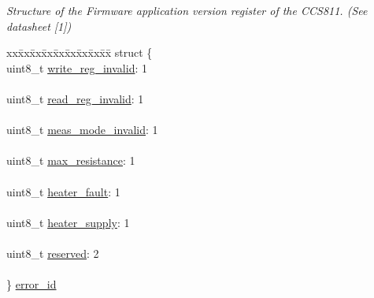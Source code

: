 \begin{DoxyCompactItemize}
\begin{tabbing}
\end{tabbing}\begin{DoxyCompactList}\small\item\em Structure of the Firmware application version register of the C\+C\+S811. (See datasheet \mbox{[}1\mbox{]}) \end{DoxyCompactList}\item 
\begin{tabbing}
xx\=xx\=xx\=xx\=xx\=xx\=xx\=xx\=xx\=\kill
struct \{\\
\>uint8\_t \mbox{\hyperlink{union_application_register_ad12c9d2951e327af89e59746d1b3d226}{write\_reg\_invalid}}: 1\\
\>\\
\>uint8\_t \mbox{\hyperlink{union_application_register_a2b3d9305e883ec18bb375b58a265bb51}{read\_reg\_invalid}}: 1\\
\>\\
\>uint8\_t \mbox{\hyperlink{union_application_register_ac1cd54e98a1f9b1b41ea65176838dae1}{meas\_mode\_invalid}}: 1\\
\>\\
\>uint8\_t \mbox{\hyperlink{union_application_register_a2759d6aaf610578f39c5e905d3d9faaa}{max\_resistance}}: 1\\
\>\\
\>uint8\_t \mbox{\hyperlink{union_application_register_a5afdc7bfd0e35f5d61dff3444cdeae18}{heater\_fault}}: 1\\
\>\\
\>uint8\_t \mbox{\hyperlink{union_application_register_ab94a39c08c3ab36f0844b5b493ef9945}{heater\_supply}}: 1\\
\>\\
\>uint8\_t \mbox{\hyperlink{union_application_register_acb7bc06bed6f6408d719334fc41698c7}{reserved}}: 2\\
\>\\
\} \mbox{\hyperlink{union_application_register_ad9e1797094efde3141e871a6fc254f72}{error\_id}}\\


\end{tabbing}
\end{DoxyCompactItemize}

